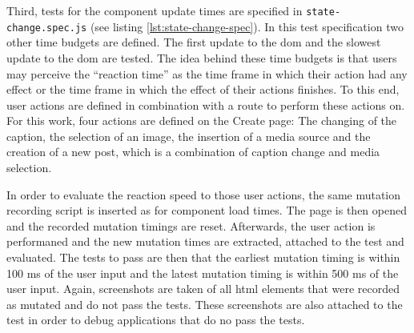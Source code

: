 \documentclass[a4paper, 12pt]{article}
\begin{document}
Third, tests for the component update times are specified in \verb|state-change.spec.js| (see listing \ref{lst:state-change-spec}).
In this test specification two other time budgets are defined.
The first update to the \acrshort{dom} and the slowest update to the \acrshort{dom} are tested.
The idea behind these time budgets is that users may perceive the \enquote{reaction time} as the time frame in which their action had any effect or the time frame in which the effect of their actions finishes.
To this end, user actions are defined in combination with a route to perform these actions on.
For this work, four actions are defined on the Create page: The changing of the caption, the selection of an image, the insertion of a media source and the creation of a new post, which is a combination of caption change and media selection.

In order to evaluate the reaction speed to those user actions, the same mutation recording script is inserted as for component load times.
The page is then opened and the recorded mutation timings are reset. Afterwards, the user action is performaned and the new mutation times are extracted, attached to the test and evaluated.
The tests to pass are then that the earliest mutation timing is within 100 ms of the user input and the latest mutation timing is within 500 ms of the user input.
Again, screenshots are taken of all \acrshort{html} elements that were recorded as mutated and do not pass the tests.
These screenshots are also attached to the test in order to debug applications that do no pass the tests.
\end{document}
